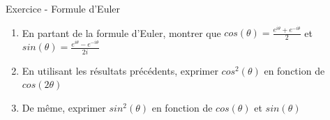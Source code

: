 \documentclass{beamer}
\newcounter{exampleBlockCounter}
\begin{document}
\begin{frame}
	\begin{exampleblock}{Exercice  - Formule d'Euler}
		\begin{enumerate}\justifying
			  \item En partant de la formule d'Euler, montrer que $cos(\theta)
			  =\frac{e^{i\theta} + e^{-i\theta}}{2}$ et $sin(\theta)
			  =\frac{e^{i\theta} - e^{-i\theta}}{2i}$
			  \item En utilisant les résultats précédents, exprimer $cos^{2}(\theta)$ en
			  fonction de $cos(2\theta)$
			  \item De même, exprimer $sin^{2}(\theta)$ en
			  fonction de $cos(\theta)$ et $sin(\theta)$
		\end{enumerate}
	\end{exampleblock}
\end{frame}

 
\end{document}
